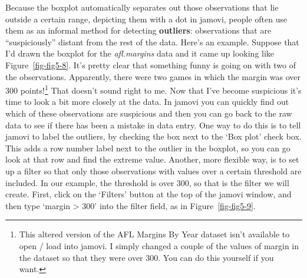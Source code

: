 \documentclass[
  a4paper,
]{book}
\begin{document}
Because the boxplot automatically separates out those observations that
lie outside a certain range, depicting them with a dot in jamovi, people
often use them as an informal method for detecting \textbf{outliers}:
observations that are ``suspiciously'' distant from the rest of the
data. Here's an example. Suppose that I'd drawn the boxplot for the
\emph{afl.margins} data and it came up looking like
Figure~\ref{fig-fig5-8}. It's pretty clear that something funny is going
on with two of the observations. Apparently, there were two games in
which the margin was over 300 points!\footnote{This altered version of
  the AFL Margins By Year dataset isn't available to open / load into
  jamovi. I simply changed a couple of the values of margin in the
  dataset so that they were over 300. You can do this yourself if you
  want.} That doesn't sound right to me. Now that I've become suspicious
it's time to look a bit more closely at the data. In jamovi you can
quickly find out which of these observations are suspicious and then you
can go back to the raw data to see if there has been a mistake in data
entry. One way to do this is to tell jamovi to label the outliers, by
checking the box next to the `Box plot' check box. This adds a row
number label next to the outlier in the boxplot, so you can go look at
that row and find the extreme value. Another, more flexible way, is to
set up a filter so that only those observations with values over a
certain threshold are included. In our example, the threshold is over
300, so that is the filter we will create. First, click on the `Filters'
button at the top of the jamovi window, and then type `margin
\textgreater{} 300' into the filter field, as in
Figure~\ref{fig-fig5-9}.
\end{document}
